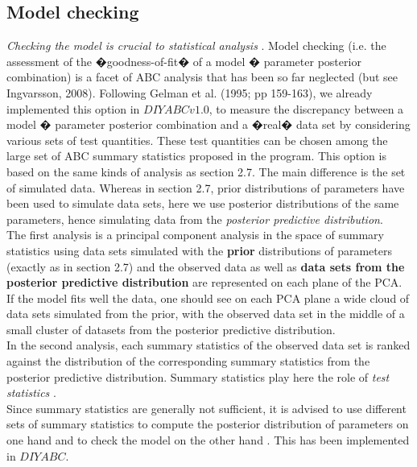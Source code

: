 \subsection{Model checking}
\emph{Checking the model is crucial to statistical analysis}  \citep[p161 in][]{GCSR1995}. Model checking (i.e. the assessment of the �goodness-of-fit� of a model � parameter posterior combination) is a facet of ABC analysis that has been so far neglected (but see Ingvarsson,  2008). Following Gelman et al. (1995; pp 159-163), we already implemented this option in $DIYABCv1.0$,  to measure the discrepancy between a model � parameter posterior combination and a �real� data set by considering various sets of test quantities. These test quantities can be chosen among the large set of ABC summary statistics proposed in the program. This option is based on the same kinds of analysis as section 2.7. The main difference is the set of simulated data. Whereas in section 2.7, prior distributions of parameters have been used to simulate data sets, here we use posterior distributions of the same parameters, hence simulating data from the \emph{posterior predictive distribution}. \\
The first analysis is a principal component analysis in the space of summary statistics using data sets simulated with the \textbf{prior} distributions of parameters (exactly as in section 2.7) and the observed data as well as \textbf{data sets from the posterior predictive distribution} are represented on each plane of the PCA. If the model fits well the data, one should see on each PCA plane a wide cloud of data sets simulated from the prior, with the observed data set in the middle of a small cluster of datasets from the posterior predictive distribution.\\
In the second analysis, each summary statistics of the observed data set is ranked against the distribution of the corresponding summary statistics from the posterior predictive distribution. Summary statistics play here the role of \emph{test statistics} \citep[p169 in][]{GCSR1995}.\\
 Since summary statistics are generally not sufficient, it is advised to use different sets of summary statistics to compute the posterior distribution of parameters on one hand and to check the model on the other hand \citep[see][]{C2010}. This has been implemented in $DIYABC$. 

